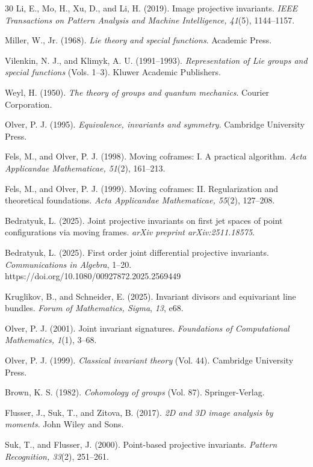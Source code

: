 \documentclass[12pt,reqno]{amsart}
\begin{document}
\begin{thebibliography}{30}
Li, E., Mo, H., Xu, D., and Li, H. (2019). Image projective invariants. \textit{IEEE Transactions on Pattern Analysis and Machine Intelligence, 41}(5), 1144--1157.

Miller, W., Jr. (1968). \textit{Lie theory and special functions}. Academic Press.

Vilenkin, N. J., and Klimyk, A. U. (1991--1993). \textit{Representation of Lie groups and special functions} (Vols. 1--3). Kluwer Academic Publishers.

Weyl, H. (1950). \textit{The theory of groups and quantum mechanics}. Courier Corporation.

Olver, P. J. (1995). \textit{Equivalence, invariants and symmetry}. Cambridge University Press.

Fels, M., and Olver, P. J. (1998). Moving coframes: I. A practical algorithm. \textit{Acta Applicandae Mathematicae, 51}(2), 161--213.

Fels, M., and Olver, P. J. (1999). Moving coframes: II. Regularization and theoretical foundations. \textit{Acta Applicandae Mathematicae, 55}(2), 127--208.

Bedratyuk, L. (2025). Joint projective invariants on first jet spaces of point configurations via moving frames. \textit{arXiv preprint arXiv:2511.18575}.

Bedratyuk, L. (2025). First order joint differential projective invariants. \textit{Communications in Algebra}, 1--20. https://doi.org/10.1080/00927872.2025.2569449

Kruglikov, B., and Schneider, E. (2025). Invariant divisors and equivariant line bundles. \textit{Forum of Mathematics, Sigma}, \textit{13}, e68.

Olver, P. J. (2001). Joint invariant signatures. \textit{Foundations of Computational Mathematics, 1}(1), 3--68.

Olver, P. J. (1999). \textit{Classical invariant theory} (Vol. 44). Cambridge University Press.

Brown, K. S. (1982). \textit{Cohomology of groups} (Vol. 87). Springer-Verlag.

Flusser, J., Suk, T., and Zitova, B. (2017). \textit{2D and 3D image analysis by moments}. John Wiley and Sons.

Suk, T., and Flusser, J. (2000). Point-based projective invariants. \textit{Pattern Recognition, 33}(2), 251--261.

\end{thebibliography}
\end{document}
